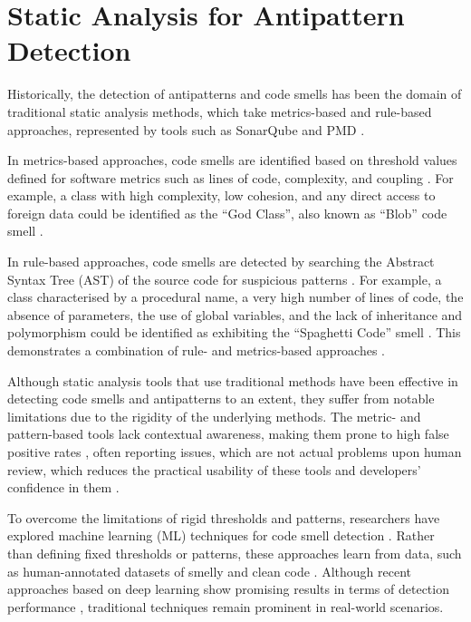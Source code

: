 \section{Static Analysis for Antipattern Detection}\label{sec:staticAnalysis}

Historically, the detection of antipatterns and code smells has been the domain of traditional static analysis methods, which take metrics-based and rule-based approaches, represented by tools such as SonarQube  and PMD .

In metrics-based approaches, code smells are identified based on threshold values defined for software metrics such as lines of code, complexity, and coupling . For example, a class with high complexity, low cohesion, and any direct access to foreign data could be identified as the “God Class”, also known as “Blob” code smell \citetext{\citealp[Ch. 3.3]{Riel1996-tv}; \citealp[pp. 73–84]{brown1998antipatterns}; \citealp[p. 355]{DBLP:conf/icsm/Marinescu04}}.

In rule-based approaches, code smells are detected by searching the Abstract Syntax Tree (AST) of the source code for suspicious patterns . For example, a class characterised by a procedural name, a very high number of lines of code, the absence of parameters, the use of global variables, and the lack of inheritance and polymorphism could be identified as exhibiting the “Spaghetti Code” smell . This demonstrates a combination of rule- and metrics-based approaches .

Although static analysis tools that use traditional methods have been effective in detecting code smells and antipatterns to an extent, they suffer from notable limitations due to the rigidity of the underlying methods. The metric- and pattern-based tools lack contextual awareness, making them prone to high false positive rates , often reporting issues, which are not actual problems upon human review, which reduces the practical usability of these tools and developers' confidence in them .

To overcome the limitations of rigid thresholds and patterns, researchers have explored machine learning (ML) techniques for code smell detection . Rather than defining fixed thresholds or patterns, these approaches learn from data, such as human-annotated datasets of smelly and clean code . Although recent approaches based on deep learning show promising results in terms of detection performance , traditional techniques remain prominent in real-world scenarios.

